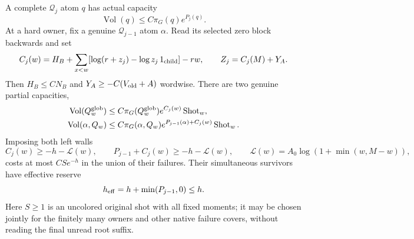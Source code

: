 \begin{lemma}
\label{upper:dual-walls}
A complete $\mathcal Q_j$ atom $q$ has actual capacity
\begin{equation}
 \operatorname{Vol}(q)\leq C\pi_G(q)e^{P_j(q)}.
 \label{upper:complete-cap}
\end{equation}
At a hard owner, fix a genuine $\mathcal Q_{j-1}$ atom $\alpha$.
Read its selected zero block backwards and set
\begin{equation}
 C_j(w)=H_B+\sum_{x<w}
       [\log(r+z_j)-\log z_j\,1_{\rm child}]-rw,
 \qquad Z_j=C_j(M)+Y_A.
 \label{upper:local-risk}
\end{equation}
Then $H_B\leq C N_B$ and
$Y_A\geq-C(V_{\rm old}+A)$ wordwise.  There are two genuine
partial capacities,
\begin{align}
 \operatorname{Vol}(Q_w^{\rm glob})
   &\leq C\pi_G(Q_w^{\rm glob})e^{C_j(w)}\operatorname{Shot}_w,
 \label{upper:global-native-cap}\\
 \operatorname{Vol}(\alpha,Q_w)
   &\leq C\pi_G(\alpha,Q_w)e^{P_{j-1}(\alpha)+C_j(w)}
        \operatorname{Shot}_w.
 \label{upper:cumulative-native-cap}
\end{align}
Imposing both left walls
\begin{equation}
 C_j(w)\geq-h-\mathcal L(w),\qquad
 P_{j-1}+C_j(w)\geq-h-\mathcal L(w),\qquad
 \mathcal L(w)=A_0\log(1+\min(w,M-w)),
 \label{upper:two-left-tests}
\end{equation}
costs at most $CS e^{-h}$ in the union of their failures.  Their
simultaneous survivors have effective reserve
\begin{equation}
 h_{\rm eff}=h+\min(P_{j-1},0)\leq h.
 \label{upper:effective-reserve}
\end{equation}
Here $S\geq1$ is an uncolored original shot with all fixed moments;
it may be chosen jointly for the finitely many owners and other
native failure covers, without reading the final unread root suffix.
\end{lemma}

